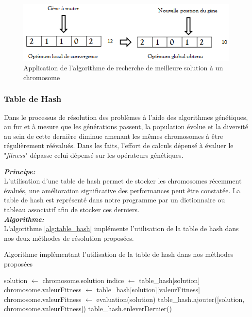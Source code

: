 	\begin{figure}[!h]
		\begin{center}
			\includegraphics[scale=.6]{images/local_search_fig.png}
			\caption{Application de l'algorithme de recherche de meilleure solution à un chromosome}
			\label{fig:local_search_fig}
		\end{center}
	\end{figure} 
	
	\subsubsection{Table de Hash}
	Dans le processus de résolution des problèmes à l'aide des algorithmes génétiques, au fur et à mesure que les générations passent, la population évolue et la diversité au sein de cette dernière diminue amenant les mêmes chromosomes à être régulièrement réévalués. Dans les faits, l'effort de calculs dépensé à évaluer le "\emph{fitness}" dépasse celui dépensé sur les opérateurs génétiques. 
	
	\hspace*{.5cm} \textbf{\textsl{Principe:}}\\
	\hspace*{.5cm} L'utilisation d'une table de hash permet de stocker les chromosomes récemment évalués, une amélioration significative des performances peut être constatée. La table de hash est représenté dans notre programme par un dictionnaire ou tableau associatif afin de stocker ces derniers.\\		
	
	\hspace*{.5cm} \textbf{\textsl{Algorithme:}}\\	
	\hspace*{.5cm} L'algorithme \ref{alg:table_hash} implémente l'utilisation de la table de hash dans nos deux méthodes de résolution proposées.\\
	\begin{algorithm}[H]
 		\caption{Algorithme implémentant l'utilisation de la table de hash dans nos méthodes proposées}
 		\label{alg:table_hash}
 		\BlankLine
 		
 		solution $\gets$ chromosome.solution\;
 		{
 			indice $\gets$ table\_hash[solution] \;
 			chromosome.valeurFitness $\gets$ table\_hash[solution][valeurFitness] \;
 		}
 		{
			chromosome.valeurFitness  $\gets$ evaluation(solution) \;
			table\_hash.ajouter([solution, chromosome.valeurFitness])\;	
			{
				table\_hash.enleverDernier() \;
			}
 		}
 	
	\end{algorithm}
	
